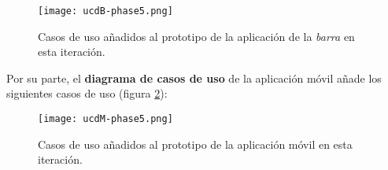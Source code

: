   \begin{figure}[H]
    \begin{center}
      \texttt{[image: ucdB-phase5.png]}
      \caption{Casos de uso añadidos al prototipo de la aplicación
      de la \emph{barra} en esta iteración.}
      \label{fig:ucdB-phase5}
    \end{center}
  \end{figure}

Por su parte, el \textbf{diagrama de casos de uso} de la aplicación móvil
añade los siguientes casos de uso (figura \ref{fig:ucdM-phase5}):

  \begin{figure}[H]
    \begin{center}
      \texttt{[image: ucdM-phase5.png]}
      \caption{Casos de uso añadidos al prototipo de la aplicación
      móvil en esta iteración.}
      \label{fig:ucdM-phase5}
    \end{center}
  \end{figure}

